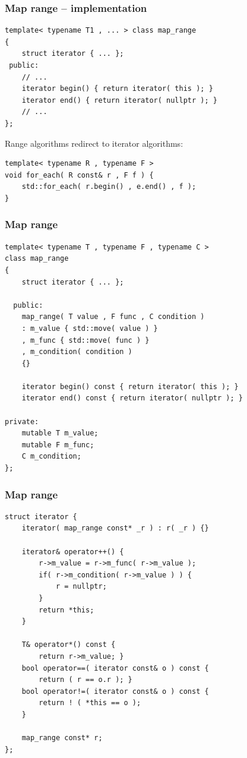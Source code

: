 \documentclass{beamer}
\newcommand{\heading}[1]{\frametitle{#1}}
\begin{document}
\begin{frame}[fragile]
  \heading{Map range -- implementation}
  
  \begin{lstlisting}[basicstyle=\scriptsize\ttfamily]
template< typename T1 , ... > class map_range
{
    struct iterator { ... };
 public:
    // ...
    iterator begin() { return iterator( this ); }
    iterator end() { return iterator( nullptr ); }
    // ...
};
   \end{lstlisting}
   
   Range algorithms redirect to iterator algorithms:
   \begin{lstlisting}[basicstyle=\scriptsize\ttfamily]
template< typename R , typename F >
void for_each( R const& r , F f ) {
    std::for_each( r.begin() , e.end() , f );
}
   \end{lstlisting}


\end{frame}



\begin{frame}[fragile]
  \heading{Map range}
  
\begin{lstlisting}[basicstyle=\scriptsize\ttfamily]
template< typename T , typename F , typename C >
class map_range
{
    struct iterator { ... };

  public:
    map_range( T value , F func , C condition )
    : m_value { std::move( value ) }
    , m_func { std::move( func ) }
    , m_condition( condition )
    {}
    
    iterator begin() const { return iterator( this ); }
    iterator end() const { return iterator( nullptr ); }
    
private:
    mutable T m_value;
    mutable F m_func;
    C m_condition;
};
\end{lstlisting}

\end{frame}


\begin{frame}[fragile]
  \heading{Map range}
  
\begin{lstlisting}[basicstyle=\scriptsize\ttfamily]
struct iterator {
    iterator( map_range const* _r ) : r( _r ) {}
    
    iterator& operator++() {
        r->m_value = r->m_func( r->m_value );
        if( r->m_condition( r->m_value ) ) {
            r = nullptr;
        }
        return *this;
    }
    
    T& operator*() const {
        return r->m_value; }
    bool operator==( iterator const& o ) const {
        return ( r == o.r ); }
    bool operator!=( iterator const& o ) const {
        return ! ( *this == o );
    }
    
    map_range const* r;
};
 
\end{lstlisting}

\end{frame}
\end{document}
